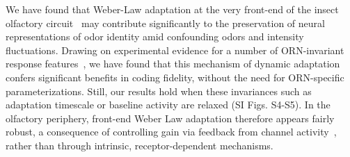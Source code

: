 \documentclass[9pt,twocolumn,twoside]{pnas-new}
\begin{document}
We have found that Weber-Law adaptation at the very front-end of the insect olfactory circuit~\cite{srinivas_elife,cafaro_WL,cao_WL} may contribute significantly to the preservation of neural representations of odor identity amid confounding odors and intensity fluctuations. Drawing on experimental evidence for a number of ORN-invariant response features~\cite{nagel_wilson_biophysical,martelli,stevens,srinivas_elife,si2017invariances}, we have found that this mechanism of dynamic adaptation confers significant benefits in coding fidelity, without the need for ORN-specific parameterizations. Still, our results hold when these invariances such as adaptation timescale or baseline activity are relaxed (SI Figs. S4-S5). In the olfactory periphery, front-end Weber Law adaptation therefore appears fairly robust, a consequence of controlling gain via feedback from channel activity~\cite{EmonetReview,nagel_wilson_biophysical,srinivas_elife}, rather than through intrinsic, receptor-dependent mechanisms. 
\end{document}
